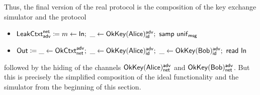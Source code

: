 \noindent Thus, the final version of the real protocol is the composition of the key exchange simulator and the protocol
\begin{itemize}
\item $\LeakCtxt^\net_\adv \coloneqq m \leftarrow \In; \ \_ \leftarrow \OkKey(\Alice)^\adv_\id; \ \samp{\unif_\msg}$
\item $\mathsf{Out} \coloneqq \_ \leftarrow \mathsf{OkCtxt}^{\mathsf{adv}}_{\mathsf{net}}; \ \_ \leftarrow \mathsf{OkKey}(\mathsf{Alice})^{\mathsf{adv}}_{\mathsf{id}}; \ \_ \leftarrow \mathsf{OkKey}(\mathsf{Bob})^{\mathsf{adv}}_{\mathsf{id}}; \ \mathsf{read} \ \mathsf{In}$
\end{itemize}
followed by the hiding of the channels $\mathsf{OkKey}(\mathsf{Alice})^{\mathsf{adv}}_{\mathsf{net}}$ and $\mathsf{OkKey}(\mathsf{Bob})^{\mathsf{adv}}_{\mathsf{net}}$. But this is precisely the simplified composition of the ideal functionality and the simulator from the beginning of this section.
